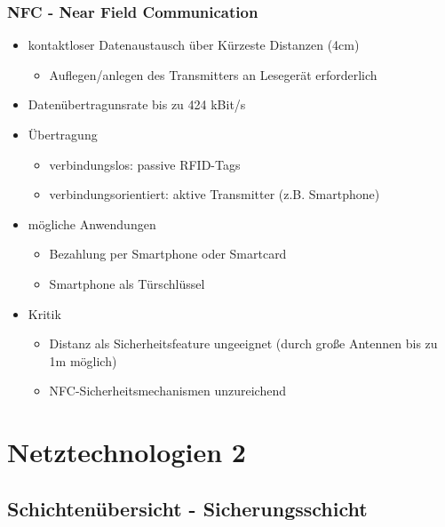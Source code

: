 \subsubsection{NFC - Near Field Communication}
\begin{itemize}
	\item kontaktloser Datenaustausch über Kürzeste Distanzen (4cm)
	\begin{itemize}
		\item Auflegen/anlegen des Transmitters an Lesegerät erforderlich
	\end{itemize}
	\item Datenübertragunsrate bis zu 424 kBit/s
	\item Übertragung
	\begin{itemize}
		\item verbindungslos: passive RFID-Tags
		\item verbindungsorientiert: aktive Transmitter (z.B. Smartphone)
	\end{itemize}
	\item mögliche Anwendungen
	\begin{itemize}
		\item Bezahlung per Smartphone oder Smartcard
		\item Smartphone als Türschlüssel
	\end{itemize}
	\item Kritik
	\begin{itemize}
		\item Distanz als Sicherheitsfeature ungeeignet (durch große Antennen bis zu 1m möglich) 
		\item NFC-Sicherheitsmechanismen unzureichend
	\end{itemize}
\end{itemize}

\section{Netztechnologien 2}
\subsection{Schichtenübersicht - Sicherungsschicht}
